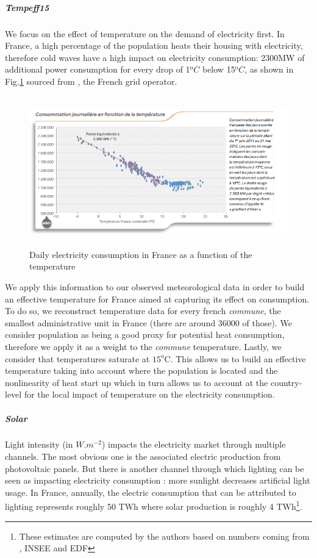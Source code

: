 \subparagraph{Tempeff15}
\label{Tempeff15}

We focus on the effect of temperature on the demand of electricity first. In France, a high percentage of the population heats their housing with electricity, therefore cold waves have a high impact on electricity consumption: 2300MW of additional power consumption for every drop of 1$^\text{o}C$ below 15$^\text{o}C$, as shown in Fig.\ref{elecconstemp} sourced from \cite{rtewebsite1}, the French grid operator. \\

\begin{figure}[!ht]
\centering
\includegraphics[height=65mm]{forqgis/Temp_Cons_France_RTE.png} 
\caption{Daily electricity consumption in France as a function of the temperature}
\label{elecconstemp}
\end{figure}


We apply this information to our observed meteorological data in order to build an effective temperature for France aimed at capturing its effect on consumption. To do so, we reconstruct temperature data for every french \emph{commune}, the smallest administrative unit in France (there are around 36000 of those). We consider population as being a good proxy for potential heat consumption, therefore we apply it as a weight to the \emph{commune} temperature. Lastly, we consider that temperatures saturate at $15^\text{o}$C. This allows us to build an effective temperature taking into account where the population is located and the nonlinearity of heat start up which in turn allows us to account at the country-level for the local impact of temperature on the electricity consumption.  \\

\subparagraph{Solar}
\label{Solar}

Light intensity (in $W.m^{-2}$) impacts the electricity market through multiple channels. The most obvious one is the associated electric production from photovoltaic panels. But there is another channel through which lighting can be seen as impacting electricity consumption : more sunlight decreases artificial light usage. In France, annually, the electric consumption that can be attributed to lighting represents roughly 50 TWh where solar production is roughly 4 TWh\footnote{These estimates are computed by the authors based on numbers coming from \cite{eleceurope}, INSEE and EDF}. \\

